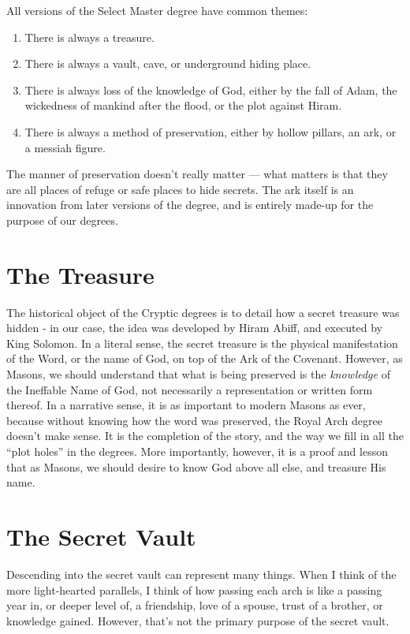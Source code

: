 \documentclass[letterpaper,11pt]{article}
\begin{document}
	All versions of the Select Master degree have common themes:
	
	\begin{enumerate}
		\item There is always a treasure.
		\item There is always a vault, cave, or underground hiding place.
		\item There is always loss of the knowledge of God, either by the fall of Adam, the wickedness of mankind after the flood, or the plot against Hiram.
		\item There is always a method of preservation, either by hollow pillars, an ark, or a messiah figure.
	\end{enumerate}
	
	The manner of preservation doesn't really matter --- what matters is that they are all places of refuge or safe places to hide secrets. The ark itself is an innovation from later versions of the degree, and is entirely made-up for the purpose of our degrees.
	
	\section*{The Treasure}
	
	The historical object of the Cryptic degrees is to detail how a secret treasure was hidden - in our case, the idea was developed by Hiram Abiff, and executed by King Solomon. In a literal sense, the secret treasure is the physical manifestation of the Word, or the name of God, on top of the Ark of the Covenant. However, as Masons, we should understand that what is being preserved is the \textit{knowledge} of the Ineffable Name of God, not necessarily a representation or written form thereof. In a narrative sense, it is as important to modern Masons as ever, because without knowing how the word was preserved, the Royal Arch degree doesn't make sense. It is the completion of the story, and the way we fill in all the “plot holes” in the degrees. More importantly, however, it is a proof and lesson that as Masons, we should desire to know God above all else, and treasure His name.
	
	\section*{The Secret Vault}
	
	Descending into the secret vault can represent many things. When I think of the more light-hearted parallels, I think of how passing each arch is like a passing year in, or deeper level of, a friendship, love of a spouse, trust of a brother, or knowledge gained. However, that's not the primary purpose of the secret vault.
	
\end{document}
